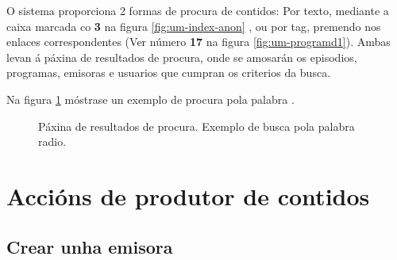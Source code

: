 O sistema proporciona 2 formas de procura de contidos: Por texto, mediante a caixa marcada co \textbf{3} na figura \ref{fig:um-index-anon} , ou por tag, premendo nos enlaces correspondentes (Ver número \textbf{17} na figura \ref{fig:um-programd1}). Ambas levan á páxina de resultados de procura, onde se amosarán os episodios, programas, emisoras e usuarios que cumpran os criterios da busca.

Na figura \ref{fig:um-search} móstrase un exemplo de procura pola palabra .

\begin{figure}[H]
	\centering
	\caption{Páxina de resultados de procura. Exemplo de busca pola palabra radio.}
	\label{fig:um-search}
\end{figure}


\section{Accións de produtor de contidos}

\subsection{Crear unha emisora}

